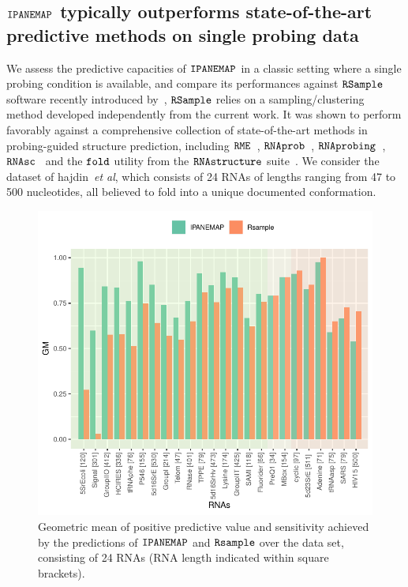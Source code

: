 \documentclass[a4,center,fleqn]{NAR}
\newcommand{\Software}[1]{$\text{\ttfamily #1}$}
\newcommand{\OurTool}{\Software{IPANEMAP}\xspace}
\newcommand{\Draft}[1]{{#1}}
\newcommand{\yp}[1]{\Draft{\todo[color=blue!30]{\sf Yann: #1}}}
\begin{document}
\yp{Reproducibility?}









\subsection{\OurTool typically outperforms state-of-the-art predictive methods on single probing data}
We assess the predictive capacities of \OurTool in a classic setting where a single probing condition is available, and compare its performances against \Software{RSample} software recently introduced by~\cite{Mathews2017}, \Software{RSample} relies on a sampling/clustering method developed independently from the current work. It was shown to perform favorably against a comprehensive collection of state-of-the-art methods in probing-guided structure prediction, including \Software{RME}~\citep{Wu2015}, \Software{RNAprob}~\citep{Deng2016}, \Software{RNAprobing}~\citep{Washietl2012}, \Software{RNAsc}~\citep{Zarringhalam2012} and the \Software{fold} utility from the \Software{RNAstructure} suite~\citep{Reuter2010}.
We consider the dataset of hajdin~\emph{et al}, which consists of 24 RNAs of lengths ranging from 47 to 500 nucleotides, all believed to fold into a unique documented conformation. 

\begin{figure}
	\includegraphics[width=\linewidth]{graphs/RsampleVsIPANEMAP/Accuracy}
	\caption{Geometric mean of positive predictive value and sensitivity achieved by the predictions of \OurTool{} and \Software{Rsample} over the \citet{Hajdin2013} data set, consisting of 24 RNAs (RNA length indicated within square brackets). \label{fig:Vsrsample}}
\end{figure}
\end{document}
